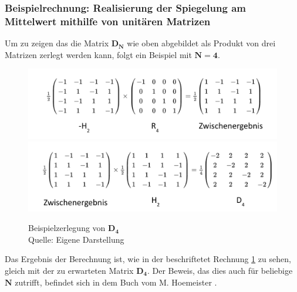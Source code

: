 \subsubsection{Beispielrechnung: Realisierung der Spiegelung am Mittelwert  mithilfe von unitären Matrizen}
Um zu zeigen das die Matrix $\mathbf{D_N}$ wie oben abgebildet als Produkt von drei Matrizen zerlegt werden kann, folgt ein Beispiel mit $\mathbf{N = 4}$.
\begin{figure}[hbtp]
	\centering
	\includegraphics[width=.8\textwidth]{figures/householderLokal_1.png}
	\includegraphics[width=.8\textwidth]{figures/householderLokal_2.png}
	\caption{Beispielzerlegung von $\mathbf{D_4}$ \\ Quelle: Eigene Darstellung}
	\label{fig:DLokal}
\end{figure}
Das Ergebnis der Berechnung ist, wie in der beschriftetet Rechnung \ref{fig:DLokal} zu sehen, gleich mit der zu erwarteten Matrix $\mathbf{D_4}$. Der Beweis, das dies auch für beliebige $\mathbf{N}$ zutrifft, befindet sich in dem Buch vom M. Hoemeister \cite[S. 309]{Ho17}.

